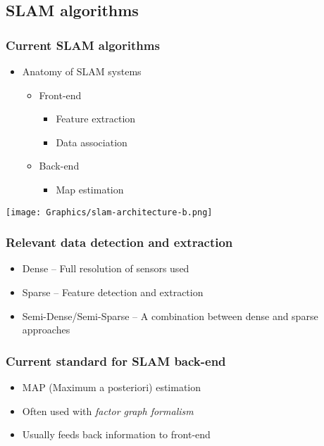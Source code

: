 \documentclass{beamerthesis}
\begin{document}
\subsection{SLAM algorithms}
\begin{frame}\frametitle{Current SLAM algorithms}
	\begin{itemize}
		\item Anatomy of SLAM systems
		\begin{itemize}
			\item Front-end
			\begin{itemize}
				\item Feature extraction
				\item Data association
			\end{itemize}
			\item Back-end
			\begin{itemize}
				\item Map estimation
			\end{itemize}
		\end{itemize}
	\end{itemize}
	\texttt{[image: Graphics/slam-architecture-b.png]}
\end{frame}

\begin{frame}\frametitle{Relevant data detection and extraction}
	\begin{itemize}
		\item Dense -- Full resolution of sensors used
		\item Sparse -- Feature detection and extraction
		\item Semi-Dense/Semi-Sparse -- A combination between dense and sparse approaches
	\end{itemize}
\end{frame}

\begin{frame}\frametitle{Current standard for SLAM back-end}
	\begin{itemize}
		\item MAP (Maximum a posteriori) estimation
		\item Often used with \emph{factor graph formalism}
		\item Usually feeds back information to front-end
	\end{itemize}
\end{frame}
\end{document}
